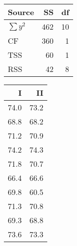 \documentclass[12pt]{article}
\begin{document}
\begin{center}
\begin{tabular}{|lrr|}
\hline
Source & SS & df\\
\hline
$\sum y^2$ & 462 & 10\\
CF & 360 & 1\\
TSS & 60 & 1\\
RSS & 42 & 8\\
\hline
\end{tabular}
\end{center}

\begin{center}
\begin{tabular}{|r|r|}
\hline
I & II\\
\hline
74.0 & 73.2\\
68.8 & 68.2\\
71.2 & 70.9\\
74.2 & 74.3\\
71.8 & 70.7\\
66.4 & 66.6\\
69.8 & 60.5\\
71.3 & 70.8\\
69.3 & 68.8\\
73.6 & 73.3\\
\hline
\end{tabular}
\end{center}
\end{document}
